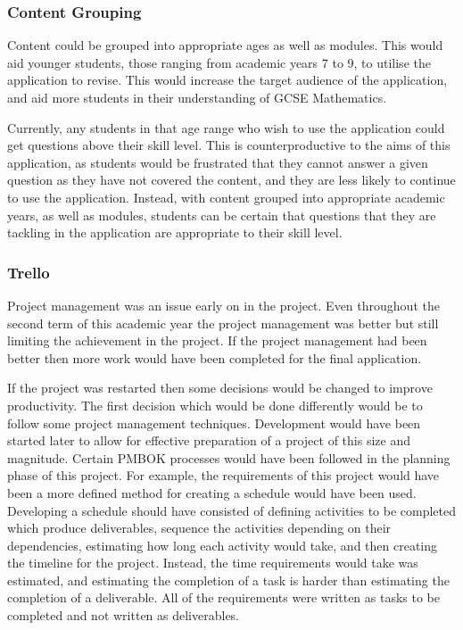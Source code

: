 \documentclass{article}
\begin{document}
\subsubsection{Content Grouping}

Content could be grouped into appropriate ages as well as modules. This would aid younger students, those ranging from academic years 7 to 9, to utilise the application to revise. This would increase the target audience of the application, and aid more students in their understanding of GCSE Mathematics. \par

Currently, any students in that age range who wish to use the application could get questions above their skill level. This is counterproductive to the aims of this application, as students would be frustrated that they cannot answer a given question as they have not covered the content, and they are less likely to continue to use the application. Instead, with content grouped into appropriate academic years, as well as modules, students can be certain that questions that they are tackling in the application are appropriate to their skill level. \par

\subsubsection{Trello}

Project management was an issue early on in the project. Even throughout the second term of this academic year the project management was better but still limiting the achievement in the project. If the project management had been better then more work would have been completed for the final application. \par

If the project was restarted then some decisions would be changed to improve productivity. The first decision which would be done differently would be to follow some project management techniques. Development would have been started later to allow for effective preparation of a project of this size and magnitude. Certain PMBOK processes would have been followed in the planning phase of this project. For example, the requirements of this project would have been a more defined method for creating a schedule would have been used. Developing a schedule should have consisted of defining activities to be completed which produce deliverables, sequence the activities depending on their dependencies, estimating how long each activity would take, and then creating the timeline for the project. Instead, the time requirements would take was estimated, and estimating the completion of a task is harder than estimating the completion of a deliverable. All of the requirements were written as tasks to be completed and not written as deliverables. \par
\end{document}
